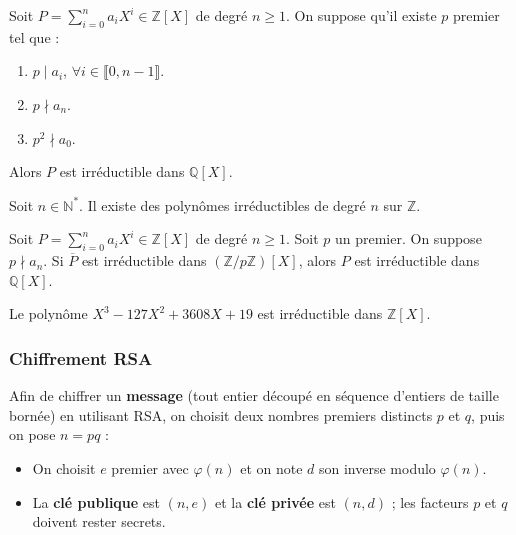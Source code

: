   \begin{theorem}
    Soit $P = \sum_{i=0}^n a_i X^i \in \mathbb{Z}[X]$ de degré $n \geq 1$. On suppose qu'il existe $p$ premier tel que :
    \begin{enumerate}[label={\bfseries(\roman*)}]
      \item $p \mid a_i$, $\forall i \in \llbracket 0, n-1 \rrbracket$.
      \item $p \nmid a_n$.
      \item $p^2 \nmid a_0$.
    \end{enumerate}
    Alors $P$ est irréductible dans $\mathbb{Q}[X]$.
  \end{theorem}


  \begin{application}
    Soit $n \in \mathbb{N}^*$. Il existe des polynômes irréductibles de degré $n$ sur $\mathbb{Z}$.
  \end{application}


  \begin{theorem}
    Soit $P = \sum_{i=0}^n a_i X^i \in \mathbb{Z}[X]$ de degré $n \geq 1$. Soit $p$ un premier. On suppose $p \nmid a_n$.
    \newpar
    Si $\overline{P}$ est irréductible dans $(\mathbb{Z}/p\mathbb{Z})[X]$, alors $P$ est irréductible dans $\mathbb{Q}[X]$.
  \end{theorem}

  \begin{example}
    Le polynôme $X^3-127X^2+3608X+19$ est irréductible dans $\mathbb{Z}[X]$.
  \end{example}

  \subsubsection{Chiffrement RSA}


  \begin{definition}
    Afin de chiffrer un \textbf{message} (tout entier découpé en séquence d'entiers de taille bornée) en utilisant RSA, on choisit deux nombres premiers distincts $p$ et $q$, puis on pose $n=pq$ :
    \begin{itemize}
      \item On choisit $e$ premier avec $\varphi(n)$ et on note $d$ son inverse modulo $\varphi(n)$.
      \item La \textbf{clé publique} est $(n,e)$ et la \textbf{clé privée} est $(n,d)$ ; les facteurs $p$ et $q$ doivent rester secrets.
    \end{itemize}
  \end{definition}

